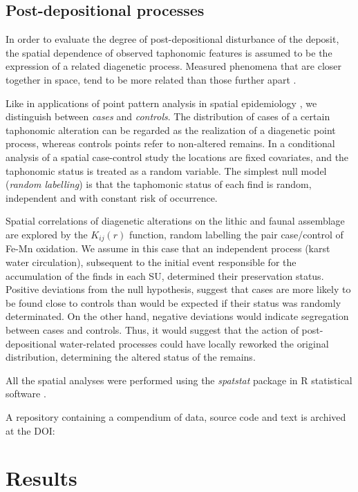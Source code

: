\documentclass[review,authoryear]{elsarticle} %
\begin{document}
\subsection{Post-depositional processes}

In order to evaluate the degree of post-depositional disturbance of the deposit, the spatial dependence of observed taphonomic features is assumed to be the expression of a related diagenetic process. Measured phenomena that are closer together in space, tend to be more related than those further apart \citep{Tobler1970}.

Like in applications of point pattern analysis in spatial epidemiology \citep{Diggle2003,Gatrell1996}, we distinguish between \emph{cases} and \emph{controls}. The distribution of cases of a certain taphonomic alteration can be regarded as the realization of a diagenetic point process, whereas controls points refer to non-altered remains. In a conditional analysis of a spatial case-control study the locations are fixed covariates, and the taphonomic status is treated as a random variable. The simplest null model (\emph{random labelling}) is that the taphomonic status of each find is random, independent and with constant risk of occurrence.

Spatial correlations of diagenetic alterations on the lithic and faunal assemblage are explored by the $K_{ij}(r)$ function, random labelling the pair case/control of Fe-Mn oxidation. We assume in this case that an independent process (karst water circulation), subsequent to the initial event responsible for the accumulation of the finds in each SU, determined their preservation status. Positive deviations from the null hypothesis, suggest that cases are more likely to be found close to controls than would be expected if their status was randomly determinated. On the other hand, negative deviations would indicate segregation between cases and controls. Thus, it would suggest that the action of post-depositional water-related processes could have locally reworked the original distribution, determining the altered status of the remains.

All the spatial analyses were performed using the \emph{spatstat} package \citep{Baddeley2015} in \textsf{R} statistical software \citep{RCoreTeam2015}.

A repository containing a compendium of data, source code and text is archived at the DOI:

\section{Results}
\end{document}
